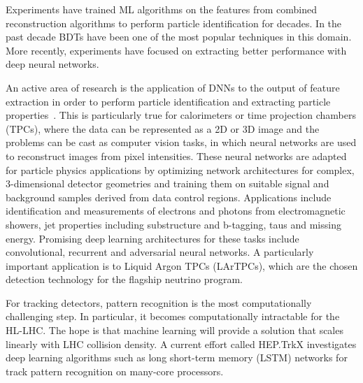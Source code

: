 
Experiments have trained ML algorithms on the features from combined reconstruction algorithms to perform particle identification for decades. In the past decade BDTs have been one of the most popular techniques in this domain. More recently, experiments have focused on extracting better performance with deep neural networks.

An active area of research is the application of DNNs to the output of feature extraction in order to perform particle identification and extracting particle properties~\cite{LHCbPID}.  This is particularly true for calorimeters or time projection chambers (TPCs), where the data can be represented as a 2D or 3D image and the problems can be cast as computer vision tasks, in which neural networks are used to reconstruct images from pixel intensities. These neural networks are adapted for particle physics applications by optimizing network architectures for complex, 3-dimensional detector geometries and training them on suitable signal and background samples derived from data control regions. Applications include identification and measurements of electrons and photons from electromagnetic showers, jet properties including substructure and b-tagging, taus and missing energy. Promising deep learning architectures for these tasks include convolutional, recurrent and adversarial neural networks. A particularly important application is to Liquid Argon TPCs (LArTPCs), which are the chosen detection technology for the flagship neutrino program. %

For tracking detectors, pattern recognition is the most computationally challenging step. In particular, it becomes computationally intractable for the HL-LHC. The hope is that machine learning will provide a solution that scales linearly with LHC collision density. A current effort called HEP.TrkX investigates deep learning algorithms such as long short-term memory (LSTM) networks for track pattern recognition on many-core processors.

